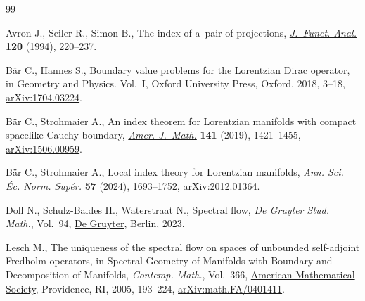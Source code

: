 \documentclass[10pt,a4paper]{amsart}
\numberwithin{equation}{section}
\begin{document}
\begin{thebibliography}{99}
\footnotesize\itemsep=0pt

Avron J., Seiler R., Simon B., The index of a~pair of projections,
  \href{https://doi.org/10.1006/jfan.1994.1031}{\textit{J.~Funct. Anal.}}
  \textbf{120} (1994), 220--237.

B\"ar C., Hannes S., Boundary value problems for the {L}orentzian {D}irac
  operator, in Geometry and Physics. {V}ol.~{I}, Oxford University Press,
  Oxford, 2018, 3--18,
  \href{http://arxiv.org/abs/1704.03224}{arXiv:1704.03224}.

B\"ar C., Strohmaier A., An index theorem for {L}orentzian manifolds with
  compact spacelike {C}auchy boundary,
  \href{https://doi.org/10.1353/ajm.2019.0037}{\textit{Amer. J.~Math.}}
  \textbf{141} (2019), 1421--1455,
  \href{http://arxiv.org/abs/1506.00959}{arXiv:1506.00959}.

B\"ar C., Strohmaier A., Local index theory for {L}orentzian manifolds,
  \href{https://doi.org/10.24033/asens.2597}{\textit{Ann. Sci. \'Ec. Norm.
  Sup\'er.}} \textbf{57} (2024), 1693--1752,
  \href{http://arxiv.org/abs/2012.01364}{arXiv:2012.01364}.

Doll N., Schulz-Baldes H., Waterstraat N., Spectral flow, \textit{De Gruyter
  Stud. Math.}, Vol.~94, \href{https://doi.org/10.1515/9783111172477}{De
  Gruyter}, Berlin, 2023.

Lesch M., The uniqueness of the spectral flow on spaces of unbounded
  self-adjoint {F}redholm operators, in Spectral Geometry of Manifolds with
  Boundary and Decomposition of Manifolds, \textit{Contemp. Math.}, Vol.~366,
  \href{https://doi.org/10.1090/conm/366/06730}{American Mathematical Society},
  Providence, RI, 2005, 193--224,
  \href{http://arxiv.org/abs/math.FA/0401411}{arXiv:math.FA/0401411}.

\end{thebibliography}
\end{document}
